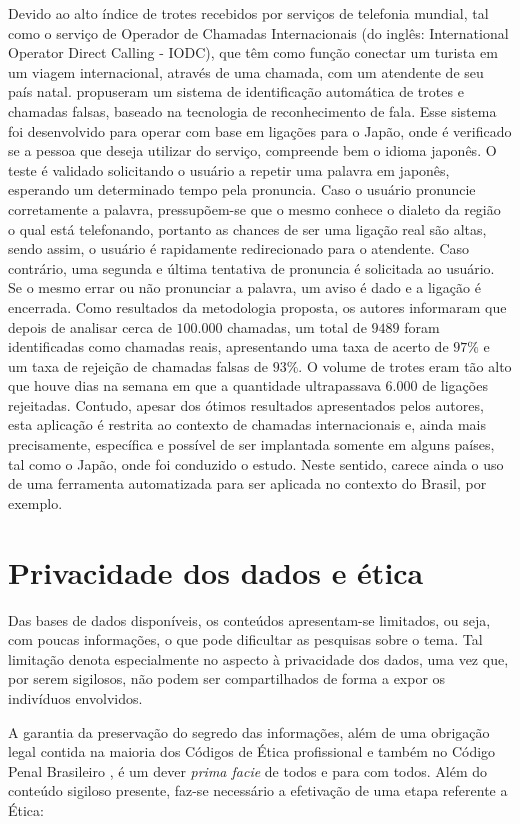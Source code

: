 Devido ao alto índice de trotes recebidos por serviços de telefonia mundial, tal como o serviço de Operador de Chamadas Internacionais (do inglês: International Operator Direct Calling - IODC), que têm como função conectar um turista em um viagem internacional, através de uma chamada, com um atendente de seu país natal. \cite{kuroiwa2004automatic} propuseram um sistema de identificação automática de trotes e chamadas falsas, baseado na tecnologia de reconhecimento de fala. Esse sistema foi desenvolvido para operar com base em ligações para o Japão, onde é verificado se a pessoa que deseja utilizar do serviço, compreende bem o idioma japonês. O teste é validado solicitando o usuário a repetir uma palavra em japonês, esperando um determinado tempo pela pronuncia. Caso o usuário pronuncie corretamente a palavra, pressupõem-se que o mesmo conhece o dialeto da região o qual está telefonando, portanto as chances de ser uma ligação real são altas, sendo assim, o usuário é rapidamente redirecionado para o atendente. Caso contrário, uma segunda e última tentativa de pronuncia é solicitada ao usuário. Se o mesmo errar ou não pronunciar a palavra, um aviso é dado e a ligação é encerrada. Como resultados da metodologia proposta, os autores informaram que depois de analisar cerca de $100.000$ chamadas, um total de $9489$ foram identificadas como chamadas reais, apresentando uma taxa de acerto de $97\%$ e um taxa de rejeição de chamadas falsas de $93\%$. O volume de trotes eram tão alto que houve dias na semana em que a quantidade ultrapassava $6.000$ de ligações rejeitadas. Contudo, apesar dos ótimos resultados apresentados pelos autores, esta aplicação é restrita ao contexto de chamadas internacionais e, ainda mais precisamente, específica e possível de ser implantada somente em alguns países, tal como o Japão, onde foi conduzido o estudo. Neste sentido, carece ainda o uso de uma ferramenta automatizada para ser aplicada no contexto do Brasil, por exemplo.

\section{Privacidade dos dados e ética}
Das bases de dados disponíveis, os conteúdos apresentam-se limitados, ou seja, com poucas informações, o que pode dificultar as pesquisas sobre o tema. Tal limitação denota  especialmente no aspecto à privacidade dos dados, uma vez que, por serem sigilosos, não podem ser compartilhados de forma a expor os indivíduos envolvidos.

A garantia da preservação do segredo das informações, além de uma obrigação legal contida na maioria dos Códigos de Ética profissional e também no Código Penal Brasileiro \citep{cp340}, é um dever \textit{prima facie} de todos e para com todos. Além do conteúdo sigiloso presente, faz-se necessário a efetivação de uma etapa referente a Ética:

